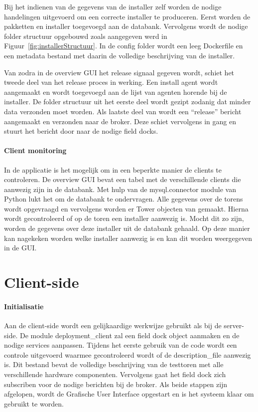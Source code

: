 Bij het indienen van de gegevens van de installer zelf worden de nodige handelingen uitgevoerd om een correcte installer te produceren.
Eerst worden de pakketten en installer toegevoegd aan de databank.
Vervolgens wordt de nodige folder structuur opgebouwd zoals aangegeven werd in Figuur~\vref{fig:installerStructuur}.
In de config folder wordt een leeg Dockerfile en een metadata bestand met daarin de volledige beschrijving van de installer.

Van zodra in de overview GUI het release signaal gegeven wordt, schiet het tweede deel van het release proces in werking.
Een install agent wordt aangemaakt en wordt toegevoegd aan de lijst van agenten horende bij de installer.
De folder structuur uit het eerste deel wordt gezipt zodanig dat minder data verzonden moet worden.
Als laatste deel van wordt een ``release'' bericht aangemaakt en verzonden naar de broker.
Deze schiet vervolgens in gang en stuurt het bericht door naar de nodige field docks.

\paragraph{Client monitoring}
In de applicatie is het mogelijk om in een beperkte manier de clients te controleren.
De overview GUI bevat een tabel met de verschillende clients die aanwezig zijn in de databank.
Met hulp van de mysql.connector module van Python lukt het om de databank te ondervragen.
Alle gegevens over de torens wordt opgevraagd en vervolgens worden er Tower objecten van gemaakt.
Hierna wordt gecontroleerd of op de toren een installer aanwezig is.
Mocht dit zo zijn, worden de gegevens over deze installer uit de databank gehaald.
Op deze manier kan nagekeken worden welke installer aanwezig is en kan dit worden weergegeven in de GUI.

\section{Client-side}
\paragraph{Initialisatie}
Aan de client-side wordt een gelijkaardige werkwijze gebruikt als bij de server-side.
De module deployment\_client zal een field dock object aanmaken en de nodige services aanpassen.
Tijdens het eerste gebruik van de code wordt een controle uitgevoerd waarmee gecontroleerd wordt of de description\_file aanwezig is.
Dit bestand bevat de volledige beschrijving van de testtoren met alle verschillende hardware componenten.
Vervolgens gaat het field dock zich subscriben voor de nodige berichten bij de broker.
Als beide stappen zijn afgelopen, wordt de Grafische User Interface opgestart en is het systeem klaar om gebruikt te worden.

